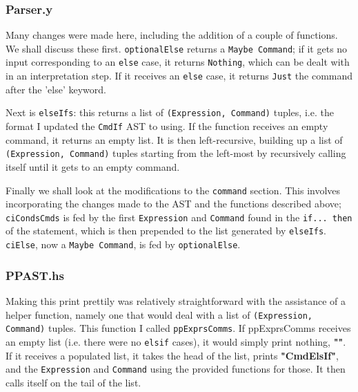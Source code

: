 \documentclass[12pt]{article}
\newcommand{\lstin}[3]{%
  
}
\begin{document}
\lstin{101}{105}{AST.hs}

\subsubsection{Parser.y}
Many changes were made here, including the addition of a couple of functions. 
We shall discuss these first. 
\verb|optionalElse| returns a \verb|Maybe Command|; if it gets no input corresponding to an \verb|else| case, it returns \verb|Nothing|, which can be dealt with in an interpretation step. 
If it receives an \verb|else| case, it returns \verb|Just| the command after the 'else' keyword.

\lstin{133}{135}{Parser.y}

Next is \verb|elseIfs|: this returns a list of \verb|(Expression, Command)| tuples, i.e. the format I updated the \verb|CmdIf| AST to using. 
If the function receives an empty command, it returns an empty list. 
It is then left-recursive, building up a list of \verb|(Expression, Command)| tuples starting from the left-most by recursively calling itself until it gets to an empty command.

\lstin{137}{139}{Parser.y}

Finally we shall look at the modifications to the \verb|command| section. 
This involves incorporating the changes made to the AST and the functions described above; \verb|ciCondsCmds| is fed by the first \verb|Expression| and \verb|Command| found in the \verb|if... then| of the statement, which is then prepended to the list generated by \verb|elseIfs|. 
\verb|ciElse|, now a \verb|Maybe Command|, is fed by \verb|optionalElse|.

\lstin{118}{119}{Parser.y}

\subsubsection{PPAST.hs}
Making this print prettily was relatively straightforward with the assistance of a helper function, namely one that would deal with a list of \verb|(Expression, Command)| tuples. 
This function I called \verb|ppExprsComms|. 
If ppExprsComms receives an empty list (i.e. there were no \verb|elsif| cases), it would simply print nothing, \textbf{""}. 
If it receives a populated list, it takes the head of the list, prints \textbf{"CmdElsIf"}, and the \verb|Expression| and \verb|Command| using the provided functions for those. 
It then calls itself on the tail of the list.

\lstin{75}{79}{PPAST.hs}
\end{document}
